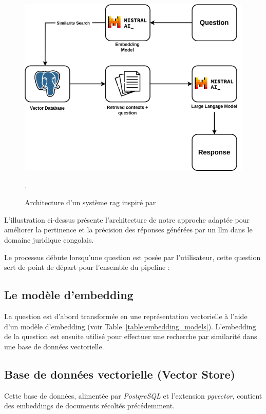 \begin{figure}[H]
    \centering
    \includegraphics[width=12cm]{gfx/fig-rag-architecture.png}
    \caption{Architecture d'un système \ac{rag} inspiré par \cite{rag_architecture}}.
    \label{fig:rag-architecture}
\end{figure}

L'illustration ci-dessus présente l'architecture de notre approche adaptée pour améliorer la pertinence et la précision des réponses générées par un \ac{llm} dans le domaine juridique congolais.

Le processus débute lorsqu'une question est posée par l'utilisateur, cette question sert de point de départ pour l'ensemble du pipeline :

\subsection{Le modèle d'embedding}
La question est d'abord transformée en une représentation vectorielle à l'aide d'un modèle d'embedding (voir Table~\ref{table:embedding_models}). L'embedding de la question est ensuite utilisé pour effectuer une recherche par similarité dans une base de données vectorielle. 

\subsection{Base de données vectorielle (Vector Store)}
\label{ch:2:section:vector-store}

Cette base de données, alimentée par \textit{PostgreSQL} et l'extension \textit{pgvector}, contient des embeddings de documents récoltés précédemment.

